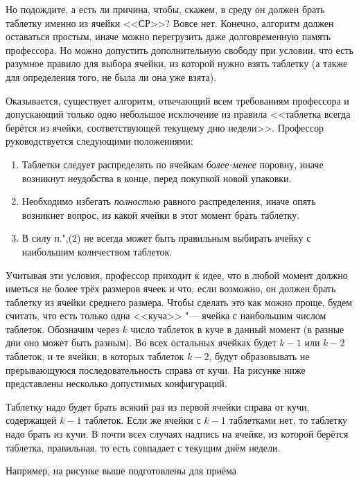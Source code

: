 \documentclass[twoside]{book}
\begin{document}
Но подождите, а есть ли причина, чтобы, скажем, в среду он должен
брать таблетку именно из ячейки <<СР>>?  Вовсе нет.
Конечно, алгоритм
должен оставаться простым, иначе можно перегрузить даже долговременную
память профессора.
Но можно допустить дополнительную свободу при
условии, что есть разумное правило для выбора ячейки, из которой нужно
взять таблетку (а также для определения того, не была ли она уже
взята).

Оказывается, существует алгоритм, отвечающий всем требованиям
профессора и допускающий только одно небольшое исключение из правила
<<таблетка всегда берётся из ячейки, соответствующей текущему дню
недели>>.
Профессор руководствуется следующими положениями:

\begin{enumerate}[label=(\arabic*),noitemsep,leftmargin=\parindent,labelsep=3.5pt]
\item Таблетки следует распределять по ячейкам \emph{более-менее} поровну, иначе возникнут неудобства в конце, перед покупкой новой упаковки.
\item Необходимо избегать \emph{полностью} равного распределения, иначе опять возникнет вопрос, из какой ячейки в этот момент брать таблетку.
\item В силу п.",(2) не всегда может быть правильным выбирать ячейку с наибольшим количеством таблеток.
\end{enumerate}

Учитывая эти условия, профессор приходит к идее, что в любой момент должно иметься не более трёх размеров ячеек и что, если возможно, он должен брать таблетку из ячейки среднего размера.
Чтобы сделать это как можно проще, будем считать, что есть только одна <<куча>> "--- ячейка с наибольшим числом таблеток.
Обозначим через $k$ число таблеток в куче в данный момент (в разные
дни оно может быть разным).
Во всех остальных ячейках будет $k-1$ или $k-2$ таблеток, и те ячейки,
в которых таблеток $k-2$, будут образовывать не прерывающуюся
последовательность справа от кучи.
На рисунке ниже представлены несколько допустимых конфигураций.

Таблетку надо будет брать всякий раз из первой ячейки справа от кучи, содержащей $k-1$ таблеток.
Если же ячейки с $k-1$ таблетками нет, то таблетку надо брать из кучи.
В почти всех случаях надпись на ячейке, из которой берётся таблетка, правильная, то есть совпадает с текущим днём недели.

Например, на рисунке выше подготовлены для приёма
\end{document}
